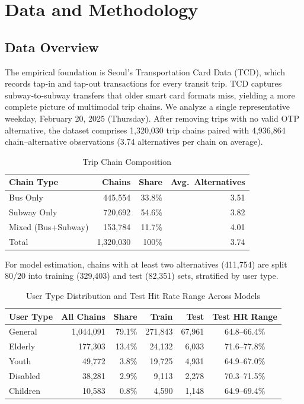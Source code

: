 \section{Data and Methodology}

\subsection{Data Overview}

The empirical foundation is Seoul's Transportation Card Data (TCD), which
records tap-in and tap-out transactions for every transit trip. TCD captures
subway-to-subway transfers that older smart card formats miss, yielding a more
complete picture of multimodal trip chains. We analyze a single representative
weekday, February 20, 2025 (Thursday). After removing trips with no valid OTP
alternative, the dataset comprises 1,320,030 trip chains paired with 4,936,864
chain--alternative observations (3.74 alternatives per chain on average).

\begin{table}[htbp]
\centering
\tablefont
\begin{tabular}{|l|r|r|r|}
\hline
\headrow
\textbf{Chain Type} & \textbf{Chains} & \textbf{Share} & \textbf{Avg.\ Alternatives} \\
\hline
Bus Only            & 445,554   & 33.8\% & 3.51 \\
\hline
Subway Only         & 720,692   & 54.6\% & 3.82 \\
\hline
Mixed (Bus+Subway)  & 153,784   & 11.7\% & 4.01 \\
\hline
Total               & 1,320,030 & 100\%  & 3.74 \\
\hline
\end{tabular}
\caption{Trip Chain Composition}
\end{table}

For model estimation, chains with at least two alternatives (411,754) are
split 80/20 into training (329,403) and test (82,351) sets, stratified by user
type.

\begin{table}[htbp]
\centering
\tablefont
\begin{tabular}{|l|r|r|r|r|c|}
\hline
\headrow
\textbf{User Type} & \textbf{All Chains} & \textbf{Share} & \textbf{Train} &
\textbf{Test} & \textbf{Test HR Range} \\
\hline
General  & 1,044,091 & 79.1\% & 271,843 & 67,961 & 64.8--66.4\% \\
\hline
Elderly  & 177,303   & 13.4\% & 24,132  & 6,033  & 71.6--77.8\% \\
\hline
Youth    & 49,772    & 3.8\%  & 19,725  & 4,931  & 64.9--67.0\% \\
\hline
Disabled & 38,281    & 2.9\%  & 9,113   & 2,278  & 70.3--71.5\% \\
\hline
Children & 10,583    & 0.8\%  & 4,590   & 1,148  & 64.9--69.4\% \\
\hline
\end{tabular}
\caption{User Type Distribution and Test Hit Rate Range Across Models}
\end{table}

